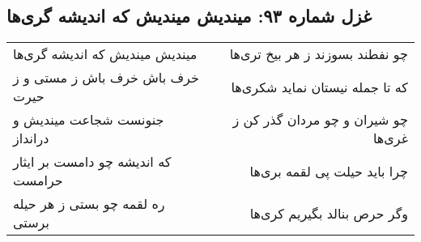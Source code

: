 \begin{center}
\section*{غزل شماره ۹۳: میندیش میندیش که اندیشه گری‌ها}
\label{sec:0093}
\begin{longtable}{l p{0.5cm} r}
میندیش میندیش که اندیشه گری‌ها
&&
چو نفطند بسوزند ز هر بیخ تری‌ها
\\
خرف باش خرف باش ز مستی و ز حیرت
&&
که تا جمله نیستان نماید شکری‌ها
\\
جنونست شجاعت میندیش و درانداز
&&
چو شیران و چو مردان گذر کن ز غری‌ها
\\
که اندیشه چو دامست بر ایثار حرامست
&&
چرا باید حیلت پی لقمه بری‌ها
\\
ره لقمه چو بستی ز هر حیله برستی
&&
وگر حرص بنالد بگیریم کری‌ها
\\
\end{longtable}
\end{center}
